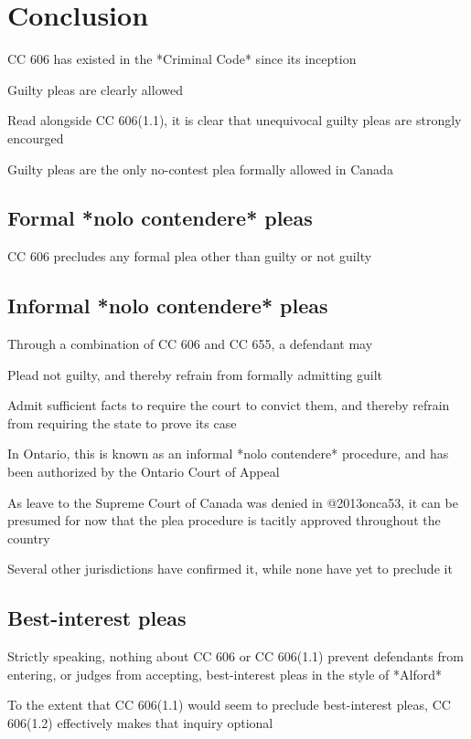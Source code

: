 \section{Conclusion}



CC 606 has existed in the *Criminal Code* since its inception

Guilty pleas are clearly allowed

Read alongside CC 606(1.1), it is clear that unequivocal guilty pleas are strongly encourged

Guilty pleas are the only no-contest plea formally allowed in Canada

\subsection{Formal *nolo contendere* pleas}

CC 606 precludes any formal plea other than guilty or not guilty

\subsection{Informal *nolo contendere* pleas}
Through a combination of CC 606 and CC 655, a defendant may

Plead not guilty, and thereby refrain from formally admitting guilt

Admit sufficient facts to require the court to convict them, and thereby refrain from requiring the state to prove its case

In Ontario, this is known as an informal *nolo contendere* procedure, and has been authorized by the Ontario Court of Appeal

As leave to the Supreme Court of Canada was denied in @2013onca53, it can be presumed for now that the plea procedure is tacitly approved throughout the country

Several other jurisdictions have confirmed it, while none have yet to preclude it

\subsection{Best-interest pleas}

Strictly speaking, nothing about CC 606 or CC 606(1.1) prevent defendants from entering, or judges from accepting, best-interest pleas in the style of *Alford*

To the extent that CC 606(1.1) would seem to preclude best-interest pleas, CC 606(1.2) effectively makes that inquiry optional


